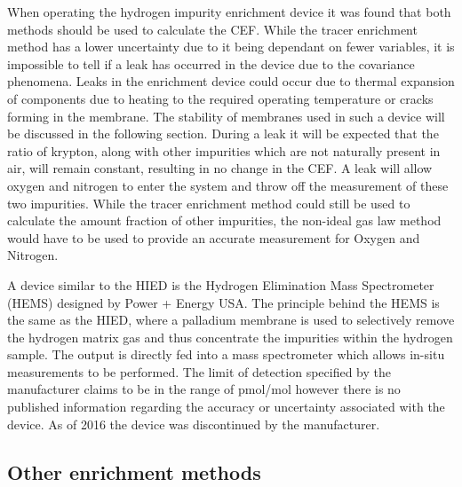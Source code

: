 When operating the hydrogen impurity enrichment device it was found that both methods should be used to 
calculate the CEF.\cite{Murugan2014, Murugan2015} While the tracer enrichment method has a lower uncertainty 
due to it being dependant on fewer variables, it is impossible to tell if a leak has occurred in the device 
due to the covariance 
phenomena. \cite{Murugan2014} Leaks in the enrichment device could occur due to thermal expansion of components due to heating 
to the required operating temperature or cracks forming in the membrane. The stability of membranes used in 
such a device will be discussed in the following section. During a leak it will be expected that the ratio of 
krypton, along with other impurities which are not naturally present in air, will remain constant, resulting 
in no change in the CEF. A leak will allow oxygen and nitrogen to enter the system and throw off the 
measurement of these two impurities. While the tracer enrichment method could still be used to calculate 
the amount fraction of other impurities, the non-ideal gas law method would have to be used to provide an 
accurate measurement for Oxygen and Nitrogen.

A device similar to the HIED is the Hydrogen Elimination Mass Spectrometer (HEMS) designed by Power + Energy USA. \cite{Bossard} 
The principle behind the HEMS is the same as the HIED, where a palladium membrane is used to selectively 
remove the hydrogen matrix gas and thus concentrate the impurities within the hydrogen sample. 
The output is directly fed into a mass spectrometer which allows in-situ measurements to be performed. 
The limit of detection specified by the manufacturer claims to be in the range of pmol/mol however there is 
no published information regarding the accuracy or uncertainty associated with the device. 
As of 2016 the device was discontinued by the manufacturer.


\subsection{Other enrichment methods}
